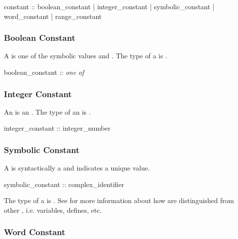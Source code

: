 \begin{Grammar}
constant ::
        boolean_constant
      | integer_constant
      | symbolic_constant
      | word_constant
      | range_constant
\end{Grammar}

\subsubsection{Boolean Constant}
\label{Boolean Constant}

A  is one of the symbolic
values  and .
%
The type of a  is \Boolean.

\begin{Grammar}
boolean_constant :: \emph{one of}
         
\end{Grammar}

\subsubsection{Integer Constant}
\label{Integer Constant}

An  is an . The type
of an  is \Integer.

\begin{Grammar}
integer_constant :: integer_number
\end{Grammar}

\subsubsection{Symbolic Constant}
\label{Symbolic Constant}

A  is syntactically a 
and indicates a unique value.

\begin{Grammar}
symbolic_constant :: complex_identifier
\end{Grammar}

\noindent The type of a  is \SymbEnum.
%
See  for more information about how
 are distinguished from other
, i.e. variables, defines, etc.

\subsubsection{Word Constant}
\label{Word Constant}

